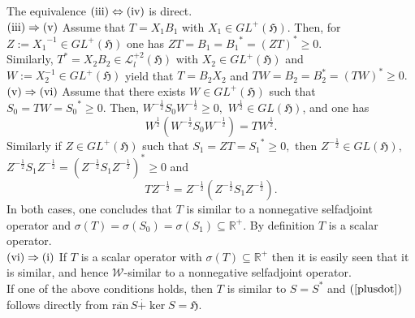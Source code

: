 \documentclass{amsart}
\makeatletter
\newcommand{\h}{\mathfrak{H}}
\newcommand{\ranbar}{\overline{\mathrm{ran}}\,}
\newcommand{\adj}{^*}
\newcommand{\inv}{^{-1}}
\newcommand{\tstar}{T^{*}}
\newcommand{\half}{^{\frac{1}{2}}}
\newcommand{\mhalf}{^{-\frac{1}{2}}}
\newcommand{\rplus}{\mathbb{R^+}}
\newcommand{\inclu}{\subseteq}
\newcommand{\gplus}{GL^{+}(\h)}
\newcommand{\ldeux}{\mathcal{L}_l^{+2}(\h)}
\numberwithin{equation}{section}
\renewenvironment{proof}[1][\proofname]{%
   \par\pushQED{\qed}\normalfont%
   \topsep6\p@\@plus6\p@\relax
   \trivlist\item[\hskip\labelsep\bfseries#1\@addpunct{.}]%
   \ignorespaces
}{%
   \popQED\endtrivlist\@endpefalse
}
\makeatother
\begin{document}
\begin{proof}
     \hspace*{0.4cm} The equivalence $\rm (iii) \Leftrightarrow (iv)$ is direct.\\
          \hspace*{0.4cm}     $\rm (iii) \Rightarrow (v)$     Assume that
          $T=X_1B_1 $ with $X_1 \in \gplus.$ Then, for $Z:= {X_1}\inv \in \gplus $ one has     $ZT= B_1= {B_1}\adj= (ZT)\adj \geq 0.$
         \\        %
        \hspace*{0.4cm}  Similarly,    $\tstar=X_2 B_2\in \ldeux$ with $ X_2\in \gplus$ and $W:= X_2\inv \in \gplus$ yield that  $T=B_2X_2$ and  $T W =B_2= B_2\adj=(TW)\adj \geq 0.  $\\
        \hspace*{0.4cm} $\rm (v) \Rightarrow (vi)$
        Assume that there exists $W \in \gplus$  such that  $S_0=T W={S_0}\adj  \geq 0.$
           Then, $ W\mhalf S_0 W\mhalf \geq 0,$ $W\half \in GL(\h)$, and one has
                 $$
                  W\half ( W\mhalf S_0 W\mhalf )  =  T W\half .
                 $$
                Similarly if   $Z \in \gplus$ such that $S_1=Z T = {S_1}\adj \geq 0,$ then $Z\mhalf \in GL(\h),$ $Z\mhalf S_1  Z\mhalf = (Z\mhalf S_1  Z\mhalf )\adj \geq 0$  and
                 $$
                 T Z\mhalf = Z\mhalf (Z\mhalf S_1  Z\mhalf).
                 $$
                In both cases, one concludes that $T$ is similar to a nonnegative selfadjoint  operator   and    $\sigma(T) =\sigma(S_0)=\sigma(S_1) \inclu \rplus $. By definition $T$ is a scalar operator.\\
          \hspace*{0.4cm} $\rm (vi) \Rightarrow (i)$ If $T$ is a scalar operator with  $\sigma(T) \inclu \rplus$ then it is easily seen that it is similar, and hence $\mathcal{W}$-similar to a nonnegative selfadjoint operator. \\
      \hspace*{0.4cm} If one of the above conditions holds, then $T$ is   similar to $S=S\adj$ and $(\ref{plusdot})$ follows directly from  $\ranbar S \overset{.}{+} \ker S=\h$.
       \end{proof}
\end{document}
